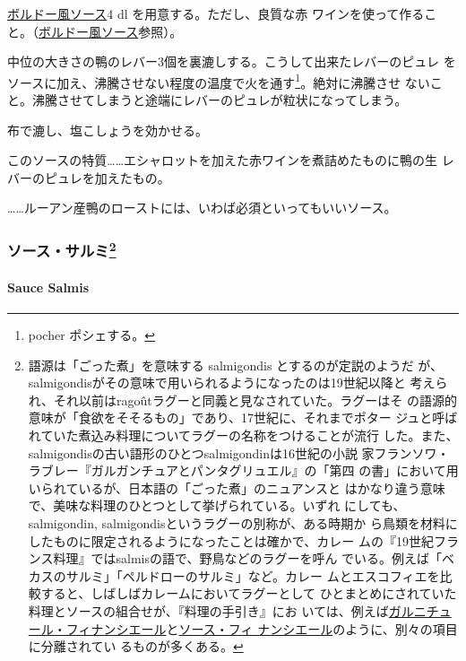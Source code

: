 \begin{recette}
\protect\hyperlink{sauce-bordelaise}{ボルドー風ソース}4 dl
を用意する。ただし、良質な赤
ワインを使って作ること。（\protect\hyperlink{sauce-bordelaise}{ボルドー風ソース}参照）。

中位の大きさの鴨のレバー3個を裏漉しする。こうして出来たレバーのピュレ
をソースに加え、沸騰させない程度の温度で火を通す\footnote{pocher
  ポシェする。}。絶対に沸騰させ
ないこと。沸騰させてしまうと途端にレバーのピュレが粒状になってしまう。

布で漉し、塩こしょうを効かせる。

このソースの特質\ldots{}\ldots{}エシャロットを加えた赤ワインを煮詰めたものに鴨の生
レバーのピュレを加えたもの。

\ldots{}\ldots{}ルーアン産鴨のローストには、いわば必須といってもいいソース。

\maeaki

\hypertarget{ux30bdux30fcux30b9ux30b5ux30ebux30df92}{%
\subsubsection[ソース・サルミ]{\texorpdfstring{ソース・サルミ\footnote{語源は「ごった煮」を意味する
  salmigondis とするのが定説のようだ
  が、salmigondisがその意味で用いられるようになったのは19世紀以降と
  考えられ、それ以前はragoûtラグーと同義と見なされていた。ラグーはそ
  の語源的意味が「食欲をそそるもの」であり、17世紀に、それまでポター
  ジュと呼ばれていた煮込み料理についてラグーの名称をつけることが流行
  した。また、salmigondisの古い語形のひとつsalmigondinは16世紀の小説
  家フランソワ・ラブレー『ガルガンチュアとパンタグリュエル』の「第四
  の書」において用いられているが、日本語の「ごった煮」のニュアンスと
  はかなり違う意味で、美味な料理のひとつとして挙げられている。いずれ
  にしても、salmigondin, salmigondisというラグーの別称が、ある時期か
  ら鳥類を材料にしたものに限定されるようになったことは確かで、カレー
  ムの『19世紀フランス料理』ではsalmisの語で、野鳥などのラグーを呼ん
  でいる。例えば「ベカスのサルミ」「ペルドローのサルミ」など。カレー
  ムとエスコフィエを比較すると、しばしばカレームにおいてラグーとして
  ひとまとめにされていた料理とソースの組合せが、『料理の手引き』にお
  いては、例えば\href{}{ガルニチュール・フィナンシエール}と\protect\hyperlink{sauce-financiere}{ソース・フィ
  ナンシエール}のように、別々の項目に分離されてい るものが多くある。}}{ソース・サルミ}}\label{ux30bdux30fcux30b9ux30b5ux30ebux30df92}}

\hypertarget{sauce-salmis}{%
\paragraph{Sauce Salmis}\label{sauce-salmis}}


\end{recette}
